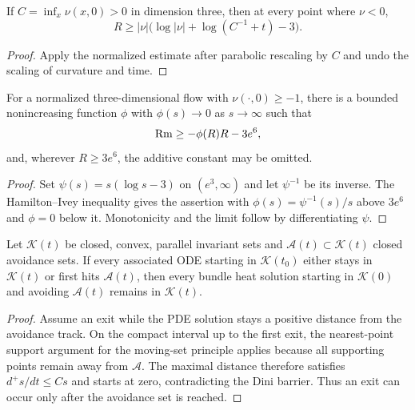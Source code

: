 \begin{corollary}
\label{cor:chow-ii-hamilton-ivey-scaling}
If $C=\inf_x\nu(x,0)>0$ in dimension three, then at every point where
$\nu<0$,
\[
R\ge|\nu|\bigl(\log|\nu|+\log(C^{-1}+t)-3\bigr).
\]
\end{corollary}
\begin{proof}
Apply the normalized estimate after parabolic rescaling by $C$ and undo the
scaling of curvature and time.
\end{proof}

\begin{corollary}
\label{cor:chow-ii-almost-nonnegative-curvature}
For a normalized three-dimensional flow with $\nu(\cdot,0)\ge-1$, there is a
bounded nonincreasing function $\phi$ with $\phi(s)\to0$ as $s\to\infty$ such
that
\[
\operatorname{Rm}\ge-\phi(R)R-3e^6,
\]
and, wherever $R\ge3e^6$, the additive constant may be omitted.
\end{corollary}
\begin{proof}
Set $\psi(s)=s(\log s-3)$ on $(e^3,\infty)$ and let $\psi^{-1}$ be its
inverse.  The Hamilton--Ivey inequality gives the assertion with
$\phi(s)=\psi^{-1}(s)/s$ above $3e^6$ and $\phi=0$ below it.  Monotonicity and
the limit follow by differentiating $\psi$.
\end{proof}

\begin{theorem}
\label{thm:chow-ii-system-avoidance-wmp}
Let $\mathcal K(t)$ be closed, convex, parallel invariant sets and
$\mathcal A(t)\subset\mathcal K(t)$ closed avoidance sets.  If every associated
ODE starting in $\mathcal K(t_0)$ either stays in $\mathcal K(t)$ or first hits
$\mathcal A(t)$, then every bundle heat solution starting in $\mathcal K(0)$
and avoiding $\mathcal A(t)$ remains in $\mathcal K(t)$.
\end{theorem}
\begin{proof}
Assume an exit while the PDE solution stays a positive distance from the
avoidance track.  On the compact interval up to the first exit, the nearest-point
support argument for the moving-set principle applies because all supporting
points remain away from $\mathcal A$.  The maximal distance therefore satisfies
$d^+s/dt\le Cs$ and starts at zero, contradicting the Dini barrier.  Thus an
exit can occur only after the avoidance set is reached.
\end{proof}

